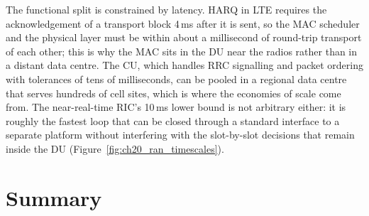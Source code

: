 \begin{inpractice}
The functional split is constrained by latency. HARQ in LTE requires the acknowledgement of a transport block 4\,ms after
it is sent, so the MAC scheduler and the physical layer must be within about a millisecond of round-trip transport of each
other; this is why the MAC sits in the DU near the radios rather than in a distant data centre. The CU, which handles RRC
signalling and packet ordering with tolerances of tens of milliseconds, can be pooled in a regional data centre that serves
hundreds of cell sites, which is where the economies of scale come from. The near-real-time RIC's 10\,ms lower bound is not
arbitrary either: it is roughly the fastest loop that can be closed through a standard interface to a separate platform
without interfering with the slot-by-slot decisions that remain inside the DU (Figure~\ref{fig:ch20_ran_timescales}).
\end{inpractice}

\section{Summary}

